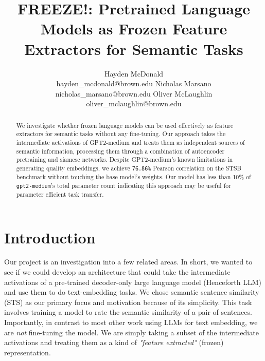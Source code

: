 \documentclass{article}
\title{FREEZE!: Pretrained Language Models as Frozen Feature Extractors for Semantic Tasks}
\author{
    Hayden McDonald\\hayden\_mcdonald@brown.edu \And
    Nicholas Marsano\\nicholas\_marsano@brown.edu\And
    Oliver McLaughlin\\oliver\_mclaughlin@brown.edu
}
\begin{document}
\maketitle

\begin{abstract}
    We investigate whether frozen language models can be used effectively as feature extractors for semantic tasks without any fine-tuning. Our approach takes the intermediate activations of GPT2-medium and treats them as independent sources of semantic information, processing them through a combination of autoencoder pretraining and siamese networks. Despite GPT2-medium's known limitations in generating quality embeddings, we achieve \verb|76.86%| Pearson correlation on the STSB benchmark without touching the base model's weights. Our model has less than 10\% of \verb|gpt2-medium|'s total parameter count indicating this approach may be useful for parameter efficient task transfer.
\end{abstract}
\setcounter{tocdepth}{4}

\section{Introduction}
Our project is an investigation into a few related areas. In short, we wanted to see if we could develop an architecture that could take the intermediate activations of a pre-trained decoder-only large language model (Henceforth LLM) and use them to do text-embedding tasks. We chose semantic sentence similarity (STS) as our primary focus and motivation because of its simplicity. This task involves training a model to rate the semantic similarity of a pair of sentences. Importantly, in contrast to most other work using LLMs for text embedding, we are \textit{not} fine-tuning the model. We are simply taking a subset of the intermediate activations and treating them as a kind of \textit{"feature extracted"} (frozen) representation.
\end{document}
